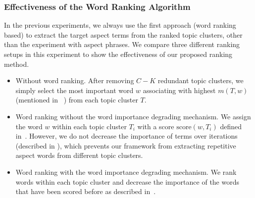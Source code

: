 \subsubsection{Effectiveness of the Word Ranking Algorithm}

In the previous experiments, we always use the first approach (word ranking based) to extract the target aspect terms from the ranked topic clusters, other than the experiment with aspect phrases. 
We compare three different ranking setups in this experiment
to show the effectiveness of our proposed ranking method.
\begin{itemize}
    \item Without word ranking. 
    	 After removing $C-K$ redundant topic clusters, 
    	 we simply select the most important word $w$ associating with highest $m(T,w)$ (mentioned in ~) 
    	 from each topic cluster $T$.
    \item Word ranking without the word importance degrading mechanism.
    	We assign the word $w$ within each topic cluster $T_i$ with a score $\text{score}(w,T_i)$ defined in~.
    	However, we do not  decrease the importance of terms over iterations (described in ),
    	which prevents our framework from extracting repetitive aspect words
    	  from different topic clusters.
    \item Word ranking with the word importance degrading mechanism.
    We rank words within
    each topic cluster and decrease the importance of the words that have been scored before as described in~.
\end{itemize}


